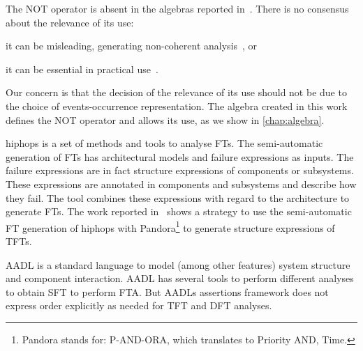 \documentclass[12pt,openright,twoside,a4paper,oldfontcommands,english,brazil,final]{abntex2}
\theoremstyle{theo}
\def\pandora{Pandora\footnote{Pandora stands for: P-AND-ORA, which translates to Priority AND, Time.}%
  \gdef\pandora{Pandora\xspace}%
  \xspace}
\begin{document}
\begin{sloppypar}
The \ac{NOT} operator is absent in the algebras reported in~\cite{WP2009,Walker2009,Merle2010,MRL2011b}.
There is no consensus about the relevance of its use:
\begin{alineasinline}
  \item it can be misleading, generating non-coherent analysis~\cite{Oliv2006}, or
  \item it can be essential in practical use~\cite{Andrews2001}.
\end{alineasinline}
Our concern is that the decision of the relevance of its use should not be due to the choice of events-occurrence representation.
The algebra created in this work defines the \ac{NOT} operator and allows its use, as we show in \cref{chap:algebra}.
\end{sloppypar}

\begin{sloppypar}
\Ac{hiphops} is a set of methods and tools to analyse \acp{FT}.
The semi-automatic generation of \acp{FT} has architectural models and failure expressions as inputs.
The failure expressions are in fact structure expressions of components or subsystems.
These expressions are annotated in components and subsystems and describe how they fail.
The tool combines these expressions with regard to the architecture to generate \acp{FT}.
The work reported in~\cite{WP2008} shows a strategy to use the semi-automatic \ac{FT} generation of \ac{hiphops} with \pandora to generate structure expressions of \acp{TFT}.
\end{sloppypar}

\Ac{AADL} is a standard language to model (among other features) system structure and component interaction. 
\Ac{AADL} has several tools to perform different analyses to obtain \ac{SFT} to perform \ac{FTA}.
But \acp{AADL} assertions framework does not express order explicitly as needed for \ac{TFT} and \ac{DFT} analyses.
\end{document}
